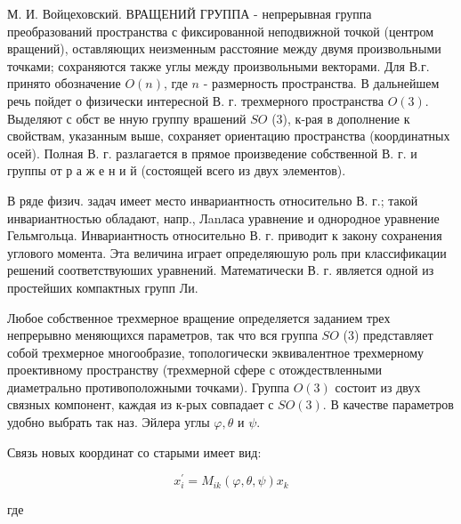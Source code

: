\documentclass[10pt]{article}
\begin{document}
М. И. Войцеховский. ВРАЩЕНИЙ ГРУППА - непрерывная группа преобразований пространства с фиксированной неподвижной точкой (центром вращений), оставляющих неизменным расстояние между двумя произвольными точками; сохраняются также углы между произвольными векторами. Для В.г. принято обозначение $O(n)$, где $n$ - размерность пространства. В дальнейшем речь пойдет о физически интересной В. г. трехмерного пространства $O(3)$. Выделяют с обст ве нную группу врашений $S O$ (3), к-рая в дополнение к свойствам, указанным выше, сохраняет ориентацию пространства (координатных осей). Полная В. г. разлагается в прямое произведение собственной В. г. и группы от р а ж е н и й (состоящей всего из двух элементов).



В ряде физич. задач имеет место инвариантность относительно В. г.; такой инвариантностью обладают, напр., Лanласа уравнение и однородное уравнение Гельмгольца. Инвариантность относительно В. г. приводит к закону сохранения углового момента. Эта величина играет определяюшую роль при классификации решений соответствуюших уравнений. Математически В. г. является одной из простейших компактных групп Ли.



Любое собственное трехмерное вращение определяется заданием трех непрерывно меняющихся параметров, так что вся группа $S O$ (3) представляет собой трехмерное многообразие, топологически эквивалентное трехмерному проективному пространству (трехмерной сфере с отождествленными диаметрально противоположными точками). Группа $O(3)$ состоит из двух связных компонент, каждая из к-рых совпадает с $S O(3)$. В качестве параметров удобно выбрать так наз. Эйлера углы $\varphi, \theta$ и $\psi$.



Связь новых координат со старыми имеет вид:



\[

x_{i}^{\prime}=M_{i k}(\varphi, \theta, \psi) x_{k}

\]



где
\end{document}
